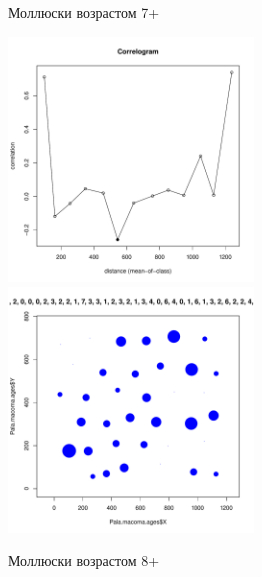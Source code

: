 \begin{figure}[h]
	\begin{minipage}[b]{\linewidth}
	\begin{center}
		Моллюски возрастом 7+
	\end{center}
	\end{minipage}

	\begin{minipage}[b]{.46\linewidth}
	\begin{center}
		\includegraphics[width=65mm]{../Barenc_Sea/distribution_Moran/Pala_macoma_age_N7_.pdf}
	\end{center}
	\end{minipage}
%
	\hfil %
%
	\begin{minipage}[b]{.46\linewidth}
	\begin{center}
		\includegraphics[width=65mm]{../Barenc_Sea/distribution_Moran/Pala_macoma_age_bubb_N7_.pdf}
	\end{center}
	\end{minipage}

	\begin{minipage}[b]{\linewidth}
	\begin{center}
		Моллюски возрастом 8+
	\end{center}
	\end{minipage}
	

\end{figure}
